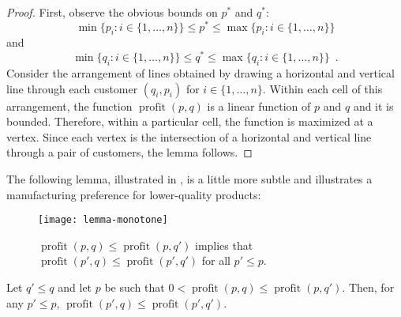 \documentclass[lotsofwhite]{patmorin}
\newcommand{\val}{\operatorname{profit}}
\begin{document}
\begin{proof}
  First, observe the obvious bounds on $p^*$ and $q^*$:
  \[
     \min\{p_i:i\in\{1,\ldots,n\}\} \le p^* 
      \le \max\{p_i:i\in\{1,\ldots,n\}\} 
  \] 
  and 
  \[
     \min\{q_i:i\in\{1,\ldots,n\}\} \le q^* 
      \le \max\{q_i:i\in\{1,\ldots,n\}\} \enspace .
  \] 
  Consider the arrangement of lines obtained by drawing a
  horizontal and vertical line through each customer $(q_i,p_i)$
  for $i\in\{1,\ldots,n\}$.  Within each cell of this arrangement,
  the function $\val(p,q)$ is a linear function of $p$ and $q$ and it is
  bounded.  Therefore, within a particular cell, the function is maximized
  at a vertex.  Since each vertex is the intersection of a horizontal
  and vertical line through a pair of customers, the lemma follows.
\end{proof}

The following lemma, illustrated in , is a
little more subtle and illustrates a manufacturing preference for
lower-quality products:
\begin{figure}
  \begin{center}
    \texttt{[image: lemma-monotone]}
  \end{center}
  \caption{$\val(p,q) \le \val(p,q')$ implies that $\val(p',q) \le
           \val(p',q')$ for all $p' \le p$.}
\end{figure}

\begin{lem}
  Let $q' \le q$ and let $p$ be such that $0 < \val(p,q) \le \val(p,q')$.
  Then, for any $p' \le p$, $\val(p',q) \le \val(p',q')$.
\end{lem}
\end{document}
